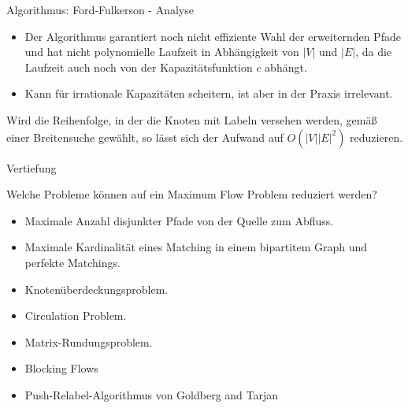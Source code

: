 \documentclass[aspectratio=169]{beamer}
\begin{document}
  \begin{frame}{Algorithmus: Ford-Fulkerson - Analyse}

  \begin{itemize}
    \item Der Algorithmus garantiert noch nicht effiziente Wahl der
    erweiternden Pfade und hat nicht polynomielle Laufzeit in Abhängigkeit von $|V|$ und $|E|$,
    da die Laufzeit auch noch von der Kapazitätsfunktion $c$ abhängt.
    \pause
    \item Kann für irrationale Kapazitäten scheitern, ist aber in der Praxis irrelevant.
  \end{itemize}

  \pause

  \begin{modifikation*}
    Wird die Reihenfolge, in der die Knoten mit Labeln versehen werden, gemäß
    einer Breitensuche gewählt, so lässt sich der Aufwand auf $O(|V||E|^2)$ reduzieren.
  \end{modifikation*}

  \end{frame}

  \begin{frame}{Vertiefung}

  \begin{anwendungen*}
    Welche Probleme können auf ein Maximum Flow Problem reduziert werden?
    \begin{itemize}
      \item Maximale Anzahl disjunkter Pfade von der Quelle zum Abfluss.
      \item Maximale Kardinalität eines Matching in einem bipartitem Graph und perfekte Matchings.
      \item Knotenüberdeckungsproblem.
      \item Circulation Problem.
      \item Matrix-Rundungsproblem.
    \end{itemize}

  \end{anwendungen*}

  \pause

  \begin{algorithmen*}
  \begin{itemize}
    \item Blocking Flows
    \item Push-Relabel-Algorithmus von Goldberg and Tarjan
  \end{itemize}

  \end{algorithmen*}



  \end{frame}
\end{document}
